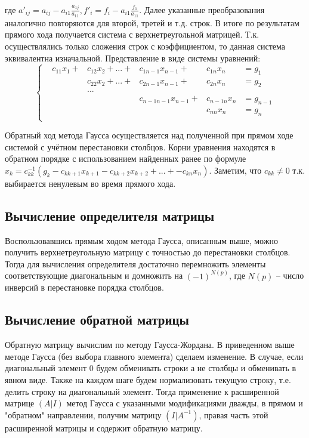 \documentclass[a4paper,12pt,titlepage,finall]{article}
\begin{document}
\\
где $a'_{ij} = a_{ij} - a_{i1} \frac{a_{1j}}{a_{11}}, f'_i = f_i - a_{i1} \frac{f_1}{a_{11}}$. Далее указанные преобразования аналогично повторяются для второй, третей и т.д. строк. В итоге по результатам прямого хода получается система с верхнетреугольной матрицей. Т.к. осуществлялись только сложения строк с коэффициентом, то данная система эквивалентна изначальной. Представление в виде системы уравнений:
\begin{equation*}
\left\{
\begin{alignedat}{3}
&c_{11} x_1 + & c_{12} x_2 + ... +&c_{1 n-1} x_{n-1} +     &c_{1n} x_n    & = g_1\\
  &           & c_{22} x_2 + ... +&c_{2 n-1} x_{n-1} +     &c_{2n} x_n    & = g_2\\
&&...&&&\\
&             &                   &c_{n - 1 n-1} x_{n-1} + &c_{n-1 n} x_n & = g_{n-1}\\
 &            &                   &                        &c_{nn} x_n    & = g_n\\
\end{alignedat}
\right.
\end{equation*}
\par
Обратный ход метода Гаусса осуществляется над полученной при прямом ходе системой с учётном перестановки столбцов. Корни уравнения находятся в обратном порядке с использованием найденных ранее по формуле $x_k = c^{-1}_{kk} (g_k - c_{k k+1}x_{k+1} - c_{k k+2}x_{k+2} + ... + - c_{k n}x_n)$. Заметим, что $c_{kk} \neq 0$ т.к. выбирается ненулевым во время прямого хода.

\subsection{Вычисление определителя матрицы}
Воспользовавшись прямым ходом метода Гаусса, описанным выше, можно получить верхнетреугольную матрицу с точностью до перестановки столбцов. Тогда для вычисления определителя достаточно перемножить элементы соответствующие диагональным и домножить на $(-1)^{N(p)}$, где $N(p)$ -- число инверсий в перестановке порядка столбцов.
\subsection{Вычисление обратной матрицы}
Обратную матрицу вычислим по методу Гаусса-Жордана. В приведенном выше методе Гаусса (без выбора главного элемента) сделаем изменение. В случае, если диагональный элемент 0 будем обменивать строки а не столбцы и обменивать в явном виде. Также на каждом шаге будем нормализовать текущую строку, т.е. делить строку на диагональный элемент. Тогда применение к расширенной матрице $(A|I)$ метод Гаусса с указанными модификациями дважды,  в прямом и "обратном" направлении, получим матрицу $(I|A^{-1})$, правая часть этой расширенной матрицы и содержит обратную матрицу.
\end{document}
